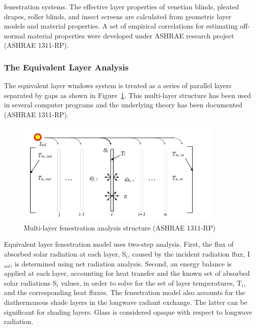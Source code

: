 fenestration systems. The effective layer properties of venetian blinds, pleated drapes, roller blinds, and insect screens are calculated from geometric layer models and material properties. A set of empirical correlations for estimating off-normal material properties were developed under ASHRAE research project (ASHRAE 1311-RP).

\subsubsection{The Equivalent Layer Analysis}\label{the-equivalent-layer-analysis}

The equivalent layer windows system is treated as a series of parallel layers separated by gaps as shown in Figure~\ref{fig:multi-layer-fenestration-analysis-structure}. This multi-layer structure has been used in several computer programs and the underlying theory has been documented (ASHRAE 1311-RP).

\begin{figure}[hbtp] %
\centering
\includegraphics[width=0.9\textwidth, height=0.9\textheight, keepaspectratio=true]{media/image1827.svg.png}
\caption{Multi-layer fenestration analysis structure (ASHRAE 1311-RP) \protect \label{fig:multi-layer-fenestration-analysis-structure}}
\end{figure}

Equivalent layer fenestration model uses two-step analysis. First, the flux of absorbed solar radiation at each layer, S\(_{i}\), caused by the incident radiation flux, I\(_{sol}\), is determined using net radiation analysis. Second, an energy balance is applied at each layer, accounting for heat transfer and the known set of absorbed solar radiations S\(_{i}\) values, in order to solve for the set of layer temperatures, T\(_{i}\), and the corresponding heat fluxes. The fenestration model also accounts for the diathermanous shade layers in the longwave radiant exchange. The latter can be significant for shading layers. Glass is considered opaque with respect to longwave radiation.


